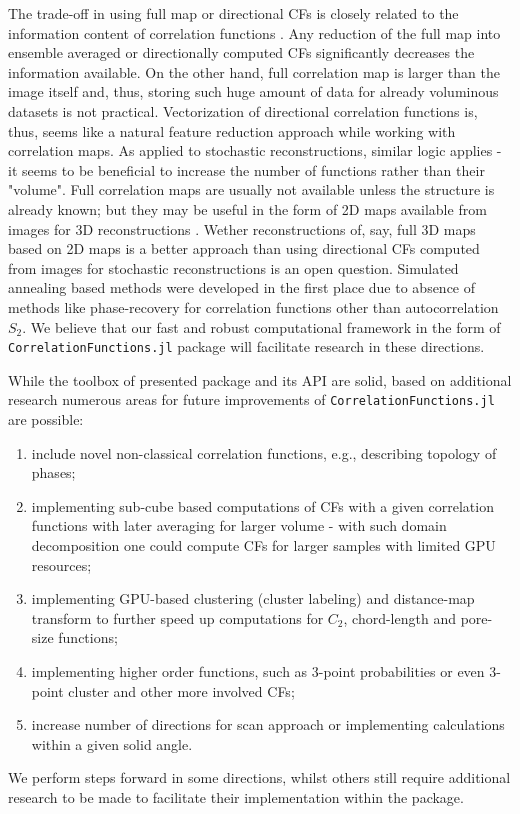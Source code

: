 \documentclass[1p]{elsarticle}
\newcommand{\code}[1]{\colorbox{light-gray}{\texttt{#1}}}
\begin{document}
The trade-off in using full map or directional CFs is closely related to the
information content of correlation functions
\cite{Gommes1,Gommes2,skolnick2021}. Any reduction of the full map into ensemble
averaged or directionally computed CFs significantly decreases the information
available. On the other hand, full correlation map is larger than the image
itself and, thus, storing such huge amount of data for already voluminous
datasets is not practical.  Vectorization of directional correlation functions
is, thus, seems like a natural feature reduction approach while working with
correlation maps. As applied to stochastic reconstructions, similar logic
applies - it seems to be beneficial to increase the number of functions rather
than their "volume". Full correlation maps are usually not available unless the
structure is already known; but they may be useful in the form of 2D maps
available from images for 3D reconstructions \cite{cherkasov2021}. Wether
reconstructions of, say, full 3D maps based on 2D maps is a better approach than
using directional CFs computed from images for stochastic reconstructions is an
open question. Simulated annealing based methods were developed in the first
place due to absence of methods like phase-recovery for correlation functions
other than autocorrelation $S_2$. We believe that our fast and robust
computational framework in the form of \code{CorrelationFunctions.jl} package
will facilitate research in these directions.

While the toolbox of presented package and its API are solid, based on
additional research numerous areas for future improvements of
\code{CorrelationFunctions.jl} are possible:
\begin{enumerate}
\item include novel non-classical correlation functions, e.g., describing
  topology of phases;
\item implementing sub-cube based computations of CFs with a given correlation
  functions with later averaging for larger volume - with such domain
  decomposition one could compute CFs for larger samples with limited GPU
  resources;
\item implementing GPU-based clustering (cluster labeling) and distance-map
  transform to further speed up computations for $C_2$, chord-length and
  pore-size functions;
\item implementing higher order functions, such as 3-point probabilities or even
  3-point cluster and other more involved CFs;
\item increase number of directions for scan approach or implementing
  calculations within a given solid angle.
\end{enumerate}
We perform steps forward in some directions, whilst others still require
additional research to be made to facilitate their implementation within the
package.
\end{document}
